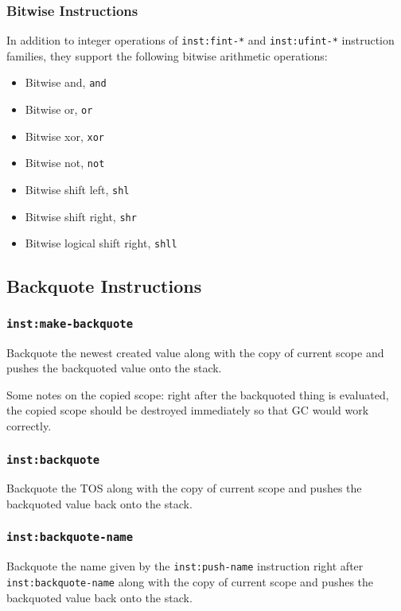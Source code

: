 \documentclass{article}
\newcommand{\inst}[1] {\texttt{inst:#1}}
\begin{document}
\subsubsection{Bitwise Instructions}

In addition to integer operations of \inst{fint-*} and \inst{ufint-*} instruction families, they support the following bitwise arithmetic operations:
\begin{itemize}
\item Bitwise and, \texttt{and}
\item Bitwise or, \texttt{or}
\item Bitwise xor, \texttt{xor}
\item Bitwise not, \texttt{not}
\item Bitwise shift left, \texttt{shl}
\item Bitwise shift right, \texttt{shr}
\item Bitwise logical shift right, \texttt{shll}
\end{itemize}

\subsection{Backquote Instructions}

\subsubsection{\inst{make-backquote}}

Backquote the newest created value along with the copy of current scope and pushes the backquoted value onto the stack.

Some notes on the copied scope: right after the backquoted thing is evaluated, the copied scope should be destroyed immediately so that GC would work correctly.

\subsubsection{\inst{backquote}}

Backquote the TOS along with the copy of current scope and pushes the backquoted value back onto the stack.

\subsubsection{\inst{backquote-name}}

Backquote the name given by the \inst{push-name} instruction right after \inst{backquote-name} along with the copy of current scope and pushes the backquoted value back onto the stack.
\end{document}
